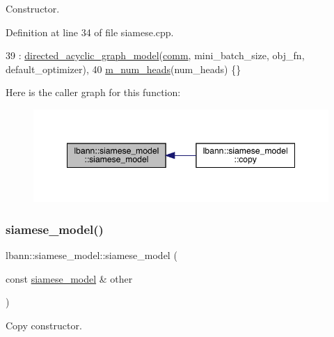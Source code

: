 Constructor. 



Definition at line 34 of file siamese.\+cpp.


\begin{DoxyCode}
39   : \hyperlink{classlbann_1_1directed__acyclic__graph__model_a2b5f8058b341073a0a95d4882fb4ff52}{directed\_acyclic\_graph\_model}(\hyperlink{file__io_8cpp_ab048c6f9fcbcfaa57ce68b00263dbebe}{comm}, mini\_batch\_size, obj\_fn, 
      default\_optimizer),
40     \hyperlink{classlbann_1_1siamese__model_ad0d7ba3cf40120b4f8e32675c5e9b3db}{m\_num\_heads}(num\_heads) \{\}
\end{DoxyCode}
Here is the caller graph for this function\+:\nopagebreak
\begin{figure}[H]
\begin{center}
\leavevmode
\includegraphics[width=348pt]{classlbann_1_1siamese__model_af8ca6d6da679f39489f0c50b62ad0069_icgraph}
\end{center}
\end{figure}
\mbox{\label{classlbann_1_1siamese__model_a7222db907cdbb05a77f8af9cdf3fd2bc}} 
\subsubsection{\texorpdfstring{siamese\+\_\+model()}{siamese\_model()}\hspace{0.1cm}{\footnotesize\ttfamily [2/2]}}
{\footnotesize\ttfamily lbann\+::siamese\+\_\+model\+::siamese\+\_\+model (\begin{DoxyParamCaption}\item[{const \hyperlink{classlbann_1_1siamese__model}{siamese\+\_\+model} \&}]{other }\end{DoxyParamCaption})\hspace{0.3cm}{\ttfamily [default]}}

Copy constructor. \mbox{\label{classlbann_1_1siamese__model_acf88f0dca9386f33311947fe0569c547}} 
